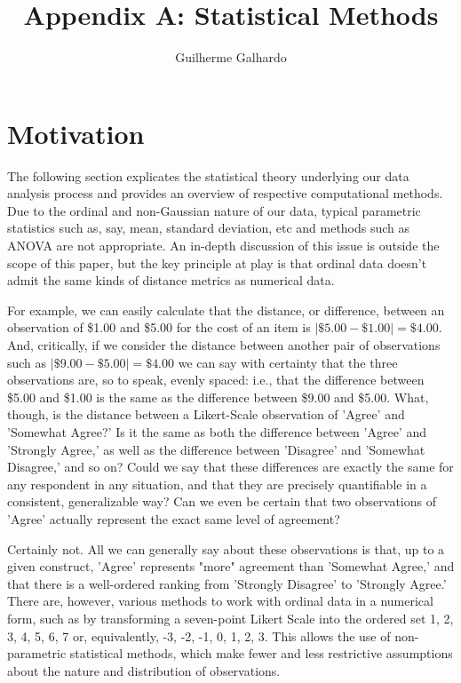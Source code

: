 \documentclass[pdflatex,sn-mathphys-num]{sn-jnl}
\title{\vspace{-50pt} Appendix A: Statistical Methods}
\author{Guilherme Galhardo}
\theoremstyle{thmstyleone}
\theoremstyle{thmstyletwo}
\theoremstyle{thmstylethree}
\begin{document}
\maketitle

    \section{Motivation} The following section explicates the statistical theory underlying our data analysis process and provides an overview of respective computational methods. Due to the ordinal and non-Gaussian nature of our data, typical parametric statistics \textemdash such as, say, mean, standard deviation, etc \textemdash and methods such as ANOVA are not appropriate. An in-depth discussion of this issue is outside the scope of this paper, but the key principle at play is that ordinal data doesn't admit the same kinds of distance metrics as numerical data. 

    \vspace{5pt}
    
    \par For example, we can easily calculate that the distance, or difference, between an observation of \$1.00 and \$5.00 for the cost of an item is $\left| \$5.00 - \$1.00 \right| = \$4.00$. And, critically, if we consider the distance between another pair of observations \textemdash such as $\left| \$9.00 - \$5.00 \right| = \$4.00$ \textemdash we can say with certainty that the three observations are, so to speak, evenly spaced: i.e., that the difference between \$5.00 and \$1.00 is the same as the difference between \$9.00 and \$5.00. What, though, is the distance between a Likert-Scale observation of 'Agree' and 'Somewhat Agree?' Is it the same as both the difference between 'Agree' and 'Strongly Agree,' as well as the difference between 'Disagree' and 'Somewhat Disagree,' and so on? Could we say that these differences are exactly the same for any respondent in any situation, and that they are precisely quantifiable in a consistent, generalizable way? Can we even be certain that two observations of 'Agree' actually represent the exact same level of agreement? 

    \vspace{5pt}
    
    \par Certainly not. All we can generally say about these observations is that, up to a given construct, 'Agree' represents "more" agreement than 'Somewhat Agree,' and that there is a well-ordered ranking from 'Strongly Disagree' to 'Strongly Agree.' There are, however, various methods to work with ordinal data in a numerical form, such as by transforming a seven-point Likert Scale into the ordered set {1, 2, 3, 4, 5, 6, 7} \textemdash or, equivalently, {-3, -2, -1, 0, 1, 2, 3}. This allows the use of non-parametric statistical methods, which make fewer and less restrictive assumptions about the nature and distribution of observations.
\end{document}
